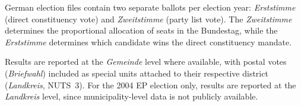 German election files contain two separate ballots per election year:
\textit{Erststimme} (direct constituency vote) and
\textit{Zweitstimme} (party list vote). The \emph{Zweitstimme} determines
the proportional allocation of seats in the Bundestag, while the \emph{Erststimme} 
determines which candidate wins the direct constituency mandate.  

Results are reported at the \textit{Gemeinde} level where available, with
postal votes (\textit{Briefwahl}) included as special units attached to their
respective district (\textit{Landkreis}, NUTS~3). For the 2004 EP election only,
results are reported at the \emph{Landkreis} level, since municipality-level 
data is not publicly available.
